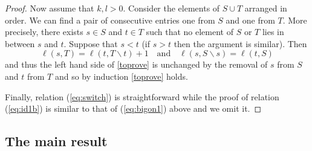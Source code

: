 \documentclass[11pt]{amsart}
\begin{document}
\begin{proof}
Now assume that $k,l > 0 $.  Consider the elements of $ S \cup T $ arranged in order.  We can find a pair of consecutive entries one from $ S $ and one from $ T $.  More precisely, there exists $ s \in S $ and $ t \in T $ such that no element of $ S $ or $ T $ lies in between $ s $ and $ t $.   Suppose that $ s < t$ (if $ s> t$ then the argument is similar).  Then 
$$ \ell(s,T) = \ell(t, T \smallsetminus t) + 1 \ \ \ \text{ and } \ \ \  \ell(s, S \smallsetminus s) = \ell(t, S) $$
and thus the left hand side of \eqref{toprove} is unchanged by the removal of $ s $ from $ S $ and $ t $ from $ T $ and so by induction \eqref{toprove} holds.

Finally, relation (\ref{eq:switch}) is straightforward while the proof of relation (\ref{eq:id1b}) is similar to that of (\ref{eq:bigon1}) above and we omit it. 
\end{proof}

\subsection{The main result}\label{sec:main}
\end{document}
